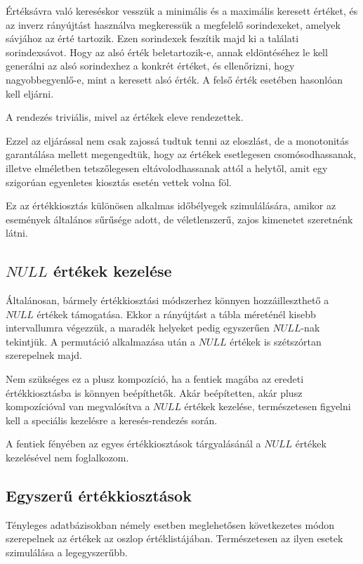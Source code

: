 \documentclass[
    parspace,
    noindent,
    nohyp,
]{elteiktdk}[2023/04/10]
\begin{document}
Értéksávra való kereséskor vesszük a minimális és a maximális keresett értéket,
és az inverz rányújtást használva megkeressük a megfelelő sorindexeket, amelyek sávjához az érté tartozik.
Ezen sorindexek feszítik majd ki a találati sorindexsávot.
Hogy az alsó érték beletartozik-e, annak eldöntéséhez le kell generálni
az alsó sorindexhez a konkrét értéket, és ellenőrizni, hogy nagyobbegyenlő-e,
mint a keresett alsó érték.
A felső érték esetében hasonlóan kell eljárni.

A rendezés triviális, mivel az értékek eleve rendezettek.

Ezzel az eljárással nem csak zajossá tudtuk tenni az eloszlást,
de a monotonitás garantálása mellett megengedtük,
hogy az értékek esetlegesen csomósodhassanak,
illetve elméletben tetszőlegesen eltávolodhassanak attól a helytől,
amit egy szigorúan egyenletes kiosztás esetén vettek volna föl.

Ez az értékkiosztás különösen alkalmas időbélyegek szimulálására,
amikor az események általános sűrűsége adott,
de véletlenszerű, zajos kimenetet szeretnénk látni.

\subsection{$NULL$ értékek kezelése}

Általánosan, bármely értékkiosztási módszerhez könnyen hozzáilleszthető a $NULL$ értékek támogatása.
Ekkor a rányújtást a tábla méreténél kisebb intervallumra végezzük,
a maradék helyeket pedig egyszerűen $NULL$-nak tekintjük.
A permutáció alkalmazása után a $NULL$ értékek is szétszórtan szerepelnek majd.

Nem szükséges ez a plusz kompozíció,
ha a fentiek magába az eredeti értékkiosztásba is könnyen beépíthetők.
Akár beépítetten, akár plusz kompozícióval van megvalósítva a $NULL$ értékek kezelése,
természetesen figyelni kell a speciális kezelésre a keresés-rendezés során.

A fentiek fényében az egyes értékkiosztások tárgyalásánál a $NULL$ értékek kezelésével nem foglalkozom.

\subsection{Egyszerű értékkiosztások}

Tényleges adatbázisokban némely esetben meglehetősen következetes módon
szerepelnek az értékek az oszlop értéklistájában.
Természetesen az ilyen esetek szimulálása a legegyszerűbb.
\end{document}
